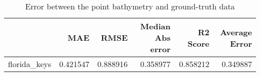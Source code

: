 \begin{table}[h!]
\caption{Error between the point bathymetry and ground-truth data}
\label{tab:florida_keys_lidar_error}
\begin{tabular}{lrrrrr}
\toprule
 & MAE & RMSE & Median Abs error & R2 Score & Average Error \\
\midrule
florida_keys & 0.421547 & 0.888916 & 0.358977 & 0.858212 & 0.349887 \\
\bottomrule
\end{tabular}
\end{table}
